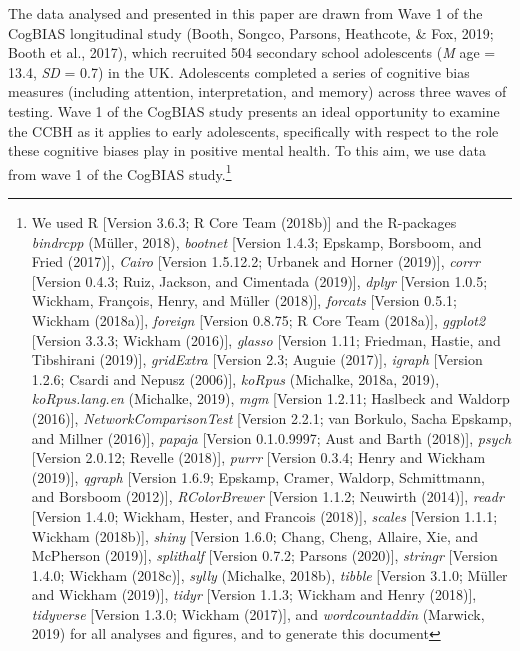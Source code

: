 \documentclass[
  english,
  man]{apa6}
\begin{document}
The data analysed and presented in this paper are drawn from Wave 1 of the CogBIAS longitudinal study (Booth, Songco, Parsons, Heathcote, \& Fox, 2019; Booth et al., 2017), which recruited 504 secondary school adolescents (\emph{M} age = 13.4, \emph{SD} = 0.7) in the UK. Adolescents completed a series of cognitive bias measures (including attention, interpretation, and memory) across three waves of testing. Wave 1 of the CogBIAS study presents an ideal opportunity to examine the CCBH as it applies to early adolescents, specifically with respect to the role these cognitive biases play in positive mental health. To this aim, we use data from wave 1 of the CogBIAS study.\footnote{We used R {[}Version 3.6.3; R Core Team (2018b){]} and the R-packages \emph{bindrcpp} (Müller, 2018), \emph{bootnet} {[}Version 1.4.3; Epskamp, Borsboom, and Fried (2017){]}, \emph{Cairo} {[}Version 1.5.12.2; Urbanek and Horner (2019){]}, \emph{corrr} {[}Version 0.4.3; Ruiz, Jackson, and Cimentada (2019){]}, \emph{dplyr} {[}Version 1.0.5; Wickham, François, Henry, and Müller (2018){]}, \emph{forcats} {[}Version 0.5.1; Wickham (2018a){]}, \emph{foreign} {[}Version 0.8.75; R Core Team (2018a){]}, \emph{ggplot2} {[}Version 3.3.3; Wickham (2016){]}, \emph{glasso} {[}Version 1.11; Friedman, Hastie, and Tibshirani (2019){]}, \emph{gridExtra} {[}Version 2.3; Auguie (2017){]}, \emph{igraph} {[}Version 1.2.6; Csardi and Nepusz (2006){]}, \emph{koRpus} (Michalke, 2018a, 2019), \emph{koRpus.lang.en} (Michalke, 2019), \emph{mgm} {[}Version 1.2.11; Haslbeck and Waldorp (2016){]}, \emph{NetworkComparisonTest} {[}Version 2.2.1; van Borkulo, Sacha Epskamp, and Millner (2016){]}, \emph{papaja} {[}Version 0.1.0.9997; Aust and Barth (2018){]}, \emph{psych} {[}Version 2.0.12; Revelle (2018){]}, \emph{purrr} {[}Version 0.3.4; Henry and Wickham (2019){]}, \emph{qgraph} {[}Version 1.6.9; Epskamp, Cramer, Waldorp, Schmittmann, and Borsboom (2012){]}, \emph{RColorBrewer} {[}Version 1.1.2; Neuwirth (2014){]}, \emph{readr} {[}Version 1.4.0; Wickham, Hester, and Francois (2018){]}, \emph{scales} {[}Version 1.1.1; Wickham (2018b){]}, \emph{shiny} {[}Version 1.6.0; Chang, Cheng, Allaire, Xie, and McPherson (2019){]}, \emph{splithalf} {[}Version 0.7.2; Parsons (2020){]}, \emph{stringr} {[}Version 1.4.0; Wickham (2018c){]}, \emph{sylly} (Michalke, 2018b), \emph{tibble} {[}Version 3.1.0; Müller and Wickham (2019){]}, \emph{tidyr} {[}Version 1.1.3; Wickham and Henry (2018){]}, \emph{tidyverse} {[}Version 1.3.0; Wickham (2017){]}, and \emph{wordcountaddin} (Marwick, 2019) for all analyses and figures, and to generate this document}
\end{document}
